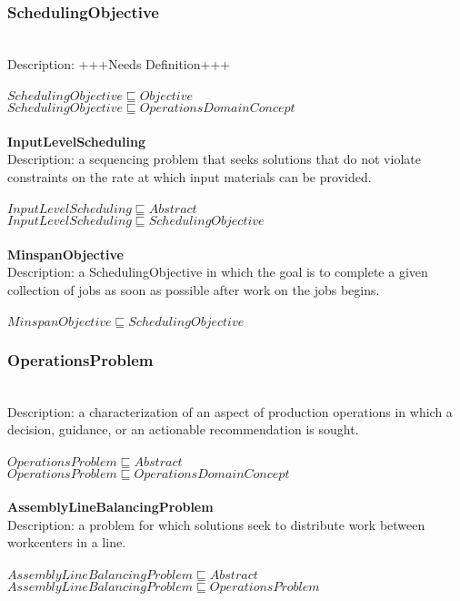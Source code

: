 \subsubsection{SchedulingObjective}\\
Description: +++Needs Definition+++\\
\\$ SchedulingObjective \sqsubseteq Objective$
\\$ SchedulingObjective \sqsubseteq OperationsDomainConcept$
\\\\   \textbf{InputLevelScheduling}\\Description: a sequencing problem that seeks solutions that do not violate constraints on the rate at which input materials can be provided. \cite{Boysen2009}\\
\\$ InputLevelScheduling \sqsubseteq Abstract$
\\$ InputLevelScheduling \sqsubseteq SchedulingObjective$
\\\\   \textbf{MinspanObjective}\\Description: a SchedulingObjective in which the goal is to complete a given collection of jobs as soon as possible after work on the jobs begins.\\
\\$ MinspanObjective \sqsubseteq SchedulingObjective$
\subsubsection{OperationsProblem}\\
Description: a characterization of an aspect of production operations in which a decision, guidance, or an actionable recommendation is sought.\\
\\$ OperationsProblem \sqsubseteq Abstract$
\\$ OperationsProblem \sqsubseteq OperationsDomainConcept$
\\\\   \textbf{AssemblyLineBalancingProblem}\\Description: a problem for which solutions seek to distribute work between workcenters in a line.\\
\\$ AssemblyLineBalancingProblem \sqsubseteq Abstract$
\\$ AssemblyLineBalancingProblem \sqsubseteq OperationsProblem$
